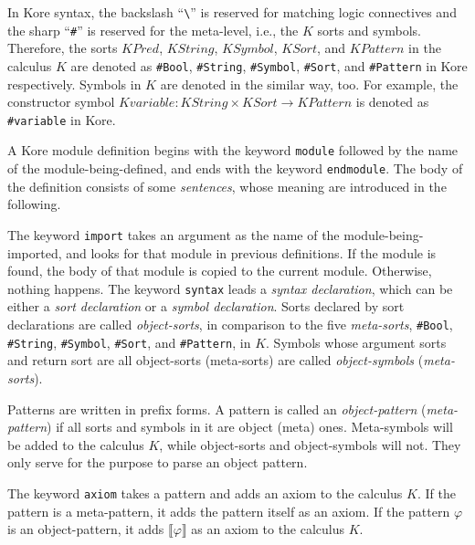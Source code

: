 \documentclass[UTF8,11pt]{article}
\theoremstyle{plain}
\theoremstyle{definition}
\theoremstyle{remark}
\newcommand{\Bracket}[1]{\llbracket#1\rrbracket}
\newcommand{\KPred}{\mathit{KPred}}
\newcommand{\KString}{\mathit{KString}}
\newcommand{\KSort}{\mathit{KSort}}
\newcommand{\KSymbol}{\mathit{KSymbol}}
\newcommand{\KPattern}{\mathit{KPattern}}
\newcommand{\Kvariable}{\mathit{Kvariable}}
\begin{document}
In Kore syntax, the backslash ``\verb|\|'' is reserved for matching logic connectives and the sharp ``\verb|#|'' is reserved for the meta-level, i.e., the $K$ sorts and symbols. 
Therefore, the sorts $\KPred$, $\KString$, $\KSymbol$, $\KSort$, and 
$\KPattern$ in the calculus $K$ are denoted as \verb|#Bool|, \verb|#String|, 
\verb|#Symbol|, \verb|#Sort|, and \verb|#Pattern| in Kore respectively.
Symbols in $K$ are denoted in the similar way, too. 
For example, the constructor symbol $\Kvariable \colon \KString \times \KSort \to \KPattern$ is denoted as \verb|#variable| in Kore. 

A Kore module definition begins with the keyword \verb|module| followed by the name of the module-being-defined, and ends with the keyword \verb|endmodule|. The body of the definition consists of some \emph{sentences}, whose meaning are introduced in the following.

The keyword \verb|import| takes an argument as the name of the module-being-imported, and looks for that module in previous definitions. 
If the module is found, the body of that module is copied to the current module.
Otherwise, nothing happens. 
The keyword \verb|syntax| leads a \emph{syntax declaration}, which can be either a \emph{sort declaration} or a \emph{symbol declaration}.
Sorts declared by sort declarations are called \emph{object-sorts}, in comparison to the five \emph{meta-sorts}, \verb|#Bool|, \verb|#String|, \verb|#Symbol|, \verb|#Sort|, and \verb|#Pattern|, in $K$. 
Symbols whose argument sorts and return sort are all object-sorts (meta-sorts) are called \emph{object-symbols} (\emph{meta-sorts}).

Patterns are written in prefix forms. 
A pattern is called an \emph{object-pattern} (\emph{meta-pattern}) if all sorts and symbols in it are object (meta) ones.
Meta-symbols will be added to the calculus $K$, while object-sorts and object-symbols will not.
They only serve for the purpose to parse an object pattern. 

The keyword \verb|axiom| takes a pattern and adds an axiom to the calculus $K$.
If the pattern is a meta-pattern, it adds the pattern itself as an axiom.
If the pattern $\varphi$ is an object-pattern, it adds $\Bracket{\varphi}$ as an axiom to the calculus $K$.
\end{document}
